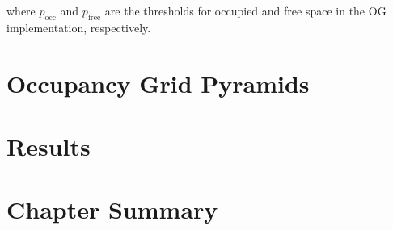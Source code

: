 where $p_{\text{occ}}$ and $p_{\text{free}}$ are the thresholds for occupied and free space in the OG implementation, respectively.

\section{Occupancy Grid Pyramids}

\section{Results}

\section{Chapter Summary}
